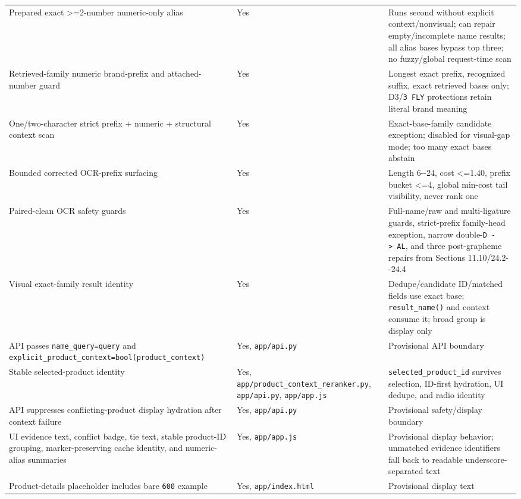 {\begin{longtable}[]{@{}>{\RaggedRight\arraybackslash}p{.22\linewidth}>{\RaggedRight\arraybackslash}p{.34\linewidth}>{\RaggedRight\arraybackslash}p{.36\linewidth}@{}}
Prepared exact \textgreater=2-number numeric-only alias & Yes & Runs second without explicit context/nonvisual; can repair empty/incomplete name results; all alias bases bypass top three; no fuzzy/global request-time scan \\
Retrieved-family numeric brand-prefix and attached-number guard & Yes & Longest exact prefix, recognized suffix, exact retrieved bases only; D3/\texttt{3\ FLY} protections retain literal brand meaning \\
One/two-character strict prefix + numeric + structural context scan & Yes & Exact-base-family candidate exception; disabled for visual-gap mode; too many exact bases abstain \\
Bounded corrected OCR-prefix surfacing & Yes & Length 6-\/-24, cost \textless=1.40, prefix bucket \textless=4, global min-cost tail visibility, never rank one \\
Paired-clean OCR safety guards & Yes & Full-name/raw and multi-ligature guards, strict-prefix family-head exception, narrow double-\texttt{D\ -\textgreater{}\ AL}, and three post-grapheme repairs from Sections 11.10/24.2-\/-24.4 \\
Visual exact-family result identity & Yes & Dedupe/candidate ID/matched fields use exact base; \texttt{result\_\allowbreak{}name()} and context consume it; broad group is display only \\
API passes \texttt{name\_\allowbreak{}query=query} and \texttt{explicit\_\allowbreak{}product\_\allowbreak{}context=bool(product\_\allowbreak{}context)} & Yes, \texttt{app/api.py} & Provisional API boundary \\
Stable selected-product identity & Yes, \texttt{app/product\_\allowbreak{}context\_\allowbreak{}reranker.py}, \texttt{app/api.py}, \texttt{app/app.js} & \texttt{selected\_\allowbreak{}product\_\allowbreak{}id} survives selection, ID-first hydration, UI dedupe, and radio identity \\
API suppresses conflicting-product display hydration after context failure & Yes, \texttt{app/api.py} & Provisional safety/display boundary \\
UI evidence text, conflict badge, tie text, stable product-ID grouping, marker-preserving cache identity, and numeric-alias summaries & Yes, \texttt{app/app.js} & Provisional display behavior; unmatched evidence identifiers fall back to readable underscore-separated text \\
Product-details placeholder includes bare \texttt{600} example & Yes, \texttt{app/index.html} & Provisional display text \\

\end{longtable}}
